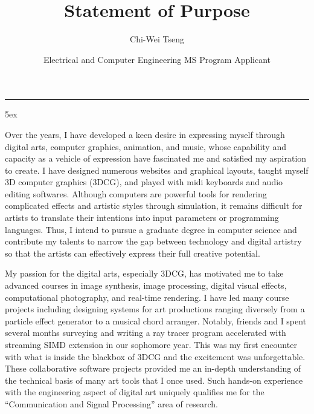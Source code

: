 \documentclass[a4paper, 11pt]{article}
\title{Statement of Purpose}
\author{Chi-Wei Tseng}
\date{Electrical and Computer Engineering MS Program Applicant}
\makeatletter
\newcommand{\HRule}{\rule{\linewidth}{0.2mm}}
\renewcommand{\maketitle}{
  \parindent=0pt%
  \begin{flushleft}
  \bf \large{\@author} \hfill {\small \@date}
  \HRule
  \end{flushleft}
  \begin{center}
    \MakeUppercase{\bf \@title}
  \end{center}%
    \par
}
\makeatother
\begin{document}
{\large
{\linespread{0.8} \maketitle}
\parindent 5ex
}

Over the years, I have developed a keen desire in expressing myself through digital arts, computer graphics, animation, and music, whose capability and capacity as a vehicle of expression have fascinated me and satisfied my aspiration to create. I have designed numerous websites and graphical layouts, taught myself 3D computer graphics (3DCG), and played with midi keyboards and audio editing softwares. Although computers are powerful tools for rendering complicated effects and artistic styles through simulation, it remains difficult for artists to translate their intentions into input parameters or programming languages. Thus, I intend to pursue a graduate degree in computer science and contribute my talents to narrow the gap between technology and digital artistry so that the artists can effectively express their full creative potential.


My passion for the digital arts, especially 3DCG, has motivated me to take advanced courses in image synthesis, image processing, digital visual effects, computational photography, and real-time rendering. I have led many course projects including designing systems for art productions ranging diversely from a particle effect generator to a musical chord arranger. Notably, friends and I spent several months surveying and writing a ray tracer program accelerated with streaming SIMD extension in our sophomore year. This was my first encounter with what is inside the blackbox of 3DCG and the excitement was unforgettable. These collaborative software projects provided me an in-depth understanding of the technical basis of many art tools that I once used. Such hands-on experience with the engineering aspect of digital art uniquely qualifies me for the ``Communication and Signal Processing'' area of research.
\end{document}
